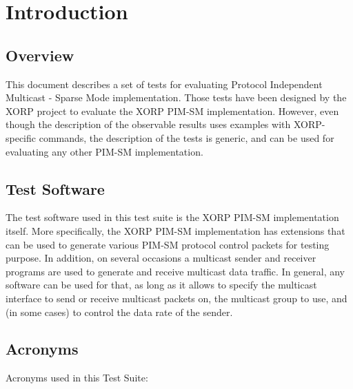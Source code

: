\documentclass[11pt]{report}
\begin{document}
\tableofcontents
\listoftables
\listoffigures

\setcounter{chapter}{-1}
\chapter{Introduction}

\section{Overview}

This document describes a set of tests for evaluating Protocol Independent
Multicast - Sparse Mode implementation. Those tests have been designed
by the XORP project to evaluate the XORP PIM-SM implementation.
However, even though the description of the observable results uses
examples with XORP-specific commands, the description of the tests is generic,
and can be used for evaluating any other PIM-SM implementation.

\section{Test Software}

The test software used in this test suite is the XORP PIM-SM implementation
itself. More specifically, the XORP PIM-SM implementation has extensions that
can be used to generate various PIM-SM protocol control packets for testing
purpose. In addition, on several occasions a multicast sender and receiver
programs are used to generate and receive multicast data traffic. In general,
any software can be used for that, as long as it allows to specify the
multicast interface to send or receive multicast packets on, the multicast
group to use, and (in some cases) to control the data rate of the sender.

\section{Acronyms}

Acronyms used in this Test Suite:
\end{document}
